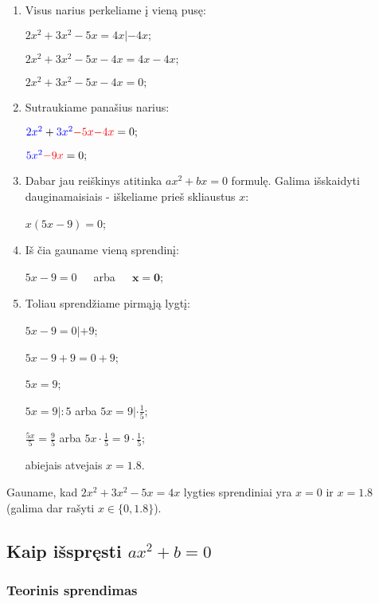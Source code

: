 \documentclass[a4paper]{article}
\begin{document}
\begin{enumerate}
    \item Visus narius perkeliame į vieną pusę:
    
    $ 2x^2 + 3x^2 - 5x = 4x | - 4x; $ 
    
    $ 2x^2 + 3x^2 - 5x - 4x = 4x - 4x; $

    $ 2x^2 + 3x^2 - 5x - 4x = 0; $

    \item Sutraukiame panašius narius:
    
    $ \textcolor{blue}{2x^2} + \textcolor{blue}{3x^2} \textcolor{red}{- 5x} \textcolor{red}{- 4x} = 0; $

    $ \textcolor{blue}{5x^2} \textcolor{red}{- 9x} = 0; $

    \item Dabar jau reiškinys atitinka $ ax^{2}+ bx = 0 $ formulę. Galima išskaidyti dauginamaisiais - iškeliame prieš skliaustus $ x $:
    
    $ x(5x - 9) = 0 $;

    \item Iš čia gauname vieną sprendinį:
    
    $ 5x-9 = 0 $ $\;\;\;$ arba $\;\;\;$ $ \boldsymbol{x=0} $;

    \item Toliau sprendžiame pirmąją lygtį: 
    
    $ 5x-9 = 0 | + 9 $;

    $ 5x-9+9 = 0+9 $;

    $ 5x = 9 $;

    $ 5x = 9|:5 $ arba $ 5x = 9|\cdot \frac{1}{5}$;

    $ \frac{5x}{5} = \frac{9}{5} $ arba $ 5x\cdot\frac{1}{5} = 9\cdot \frac{1}{5}$;

    abiejais atvejais $ x = 1.8 $.

\end{enumerate}

Gauname, kad $ 2x^2 + 3x^2 - 5x = 4x $ lygties sprendiniai yra $x=0$ ir $ x = 1.8 $ (galima dar rašyti $ x \in \{0, 1.8\} $).
   
\subsection{Kaip išspręsti $ ax^{2}+b=0 $}

\subsubsection{Teorinis sprendimas}
\end{document}
